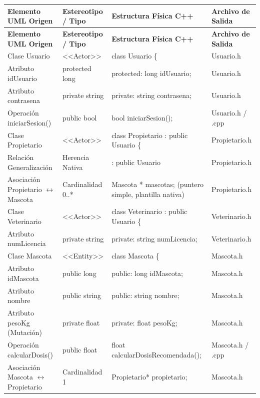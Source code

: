 \documentclass[journal,onecolumn]{IEEEtran}
\begin{document}
	\begin{longtable}{|p{3.5cm}|p{3.5cm}|p{4.2cm}|p{3.8cm}|}
		\hline
		\textbf{Elemento UML Origen} & \textbf{Estereotipo / Tipo} & \textbf{Estructura Física C++} & \textbf{Archivo de Salida} \\
		\hline
		\endfirsthead
		\hline
		\textbf{Elemento UML Origen} & \textbf{Estereotipo / Tipo} & \textbf{Estructura Física C++} & \textbf{Archivo de Salida} \\
		\hline
		\endhead
		\hline
		\footnoterule
		\endfoot
		\hline
		\endlastfoot
		Clase Usuario & <<Actor>> & class Usuario \{ & Usuario.h \\ \hline
		Atributo idUsuario & protected long & protected: long idUsuario; & Usuario.h \\ \hline
		Atributo contrasena & private string & private: string contrasena; & Usuario.h \\ \hline
		Operación iniciarSesion() & public bool & bool iniciarSesion(); & Usuario.h / .cpp \\ \hline
		
		Clase Propietario & <<Actor>> & class Propietario : public Usuario \{ & Propietario.h \\ \hline
		Relación Generalización & Herencia Nativa & : public Usuario & Propietario.h \\ \hline
		Asociación Propietario $\leftrightarrow$ Mascota & Cardinalidad 0..* & Mascota * mascotas; (puntero simple, plantilla nativa) & Propietario.h \\ \hline
		
		Clase Veterinario & <<Actor>> & class Veterinario : public Usuario \{ & Veterinario.h \\ \hline
		Atributo numLicencia & private string & private: string numLicencia; & Veterinario.h \\ \hline
		
		Clase Mascota & <<Entity>> & class Mascota \{ & Mascota.h \\ \hline
		Atributo idMascota & public long & public: long idMascota; & Mascota.h \\ \hline
		Atributo nombre & public string & public: string nombre; & Mascota.h \\ \hline
		Atributo pesoKg (Mutación) & private float & private: float pesoKg; & Mascota.h \\ \hline
		Operación calcularDosis() & public float & float calcularDosisRecomendada(); & Mascota.h / .cpp \\ \hline
		Asociación Mascota $\leftrightarrow$ Propietario & Cardinalidad 1 & Propietario* propietario; & Mascota.h \\ \hline
		

\end{longtable}
\end{document}
